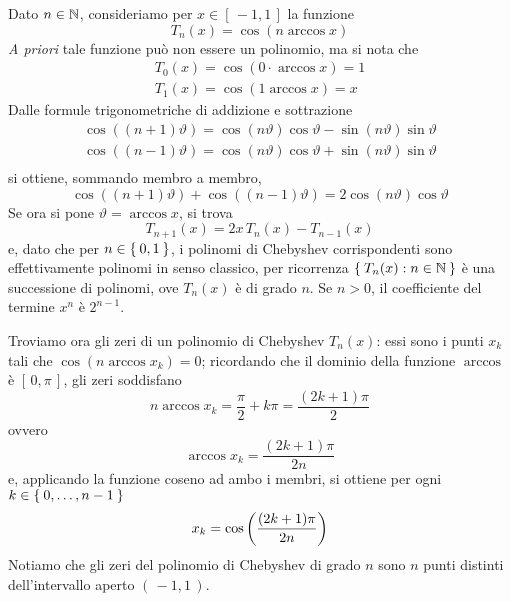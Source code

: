 	\noindent Dato \(n \in \mathbb{N}\), consideriamo per \(x \in [\, -1, 1 \,]\) la funzione
	\begin{equation}\label{eq:polin-cheb-def}
		T_n (x) = \cos (n \arccos x)
	\end{equation}
	\emph{A priori} tale funzione può non essere un polinomio, ma si nota che
	\begin{gather*}
		T_0 (x) = \cos (0 \cdot \arccos x) = 1 \\
		T_1 (x) = \cos (1 \arccos x) = x
	\end{gather*}
	Dalle formule trigonometriche di addizione e sottrazione
	\begin{gather*}
		\cos ((n + 1) \vartheta) = \cos (n \vartheta) \cos \vartheta - \sin (n \vartheta) \sin \vartheta \\
		\cos ((n - 1) \vartheta) = \cos (n \vartheta) \cos \vartheta + \sin (n \vartheta) \sin \vartheta \\
	\end{gather*}
	si ottiene, sommando membro a membro,
	\begin{equation*}
		\cos ((n + 1) \vartheta) + \cos ((n - 1) \vartheta) = 2 \cos(n \vartheta) \cos \vartheta
	\end{equation*}
	Se ora si pone \(\vartheta = \arccos x\), si trova
	\begin{equation}\label{eq:polin-cheb-formula}
		T_{n + 1} (x) = 2 x \, T_n (x) - T_{n - 1} (x)
	\end{equation}
	e, dato che per \(n \in \Set{0, 1}\), i polinomi di Chebyshev corrispondenti sono effettivamente polinomi in senso classico, per ricorrenza \(\Set{T_n (x) : n \in \mathbb{N}}\) è una successione di polinomi, ove \(T_n (x)\) è di grado \(n\). Se \(n > 0\), il coefficiente del termine \(x^n\) è \(2^{n - 1}\).
	
	Troviamo ora gli zeri di un polinomio di Chebyshev \(T_n (x)\): essi sono i punti \(x_k\) tali che \(\cos (n \arccos x_k) = 0\); ricordando che il dominio della funzione \(\arccos\) è \([\, 0, \pi \,]\), gli zeri soddisfano
	\begin{equation*}
		n \arccos x_k = \frac{\pi}{2} + k \pi = \frac{(2 k + 1) \pi}{2}
	\end{equation*}
	ovvero
	\begin{equation*}
		\arccos x_k = \frac{(2 k + 1) \pi}{2 n}
	\end{equation*}
	e, applicando la funzione coseno ad ambo i membri, si ottiene per ogni \(k \in \Set{0, \dots, n - 1}\)
	\begin{equation}\label{eq:polin-cheb-zeri}
		x_k = \cos \qty(\frac{(2 k + 1) \pi}{2 n})
	\end{equation}
	Notiamo che gli zeri del polinomio di Chebyshev di grado \(n\) sono \(n\) punti distinti dell'intervallo aperto \((\, -1, 1 \,)\).
	
